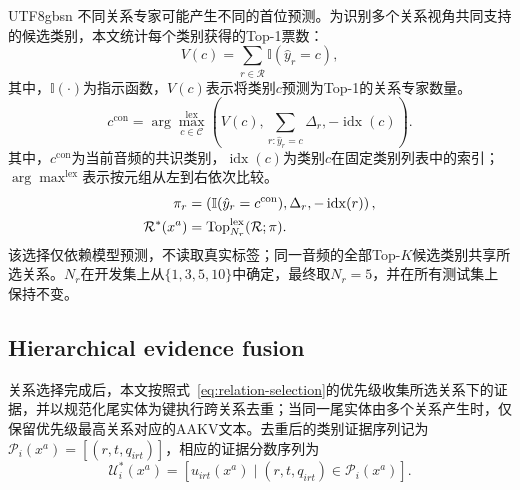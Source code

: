 \begin{CJK*}{UTF8}{gbsn}
不同关系专家可能产生不同的首位预测。为识别多个关系视角共同支持的候选类别，本文统计每个类别获得的Top-1票数：
\begin{equation}
V(c)=\sum_{r\in\mathcal R}\mathbb I(\hat y_r=c),
\label{eq:voting}
\end{equation}
其中，$\mathbb I(\cdot)$为指示函数，$V(c)$表示将类别$c$预测为Top-1的关系专家数量。
\begin{equation}
c^{\mathrm{con}}=\arg\max_{c\in\mathcal C}^{\mathrm{lex}}\left(V(c),\sum_{r:\hat y_r=c}\Delta_r,-\operatorname{idx}(c)\right).
\label{eq:consensus}
\end{equation}
其中，$c^{\mathrm{con}}$为当前音频的共识类别，$\operatorname{idx}(c)$为类别$c$在固定类别列表中的索引；$\arg\max^{\mathrm{lex}}$表示按元组从左到右依次比较。
\begin{equation}
\begin{aligned}
\pi_r&=\left(\mathbb I(\hat y_r=c^{\mathrm{con}}),\Delta_r,-\operatorname{idx}(r)\right),\\
\mathcal R^*(x^a)&=\operatorname{Top}_{N_r}^{\mathrm{lex}}(\mathcal R;\pi).
\end{aligned}
\label{eq:relation-selection}
\end{equation}
该选择仅依赖模型预测，不读取真实标签；同一音频的全部Top-$K$候选类别共享所选关系。$N_r$在开发集上从$\{1,3,5,10\}$中确定，最终取$N_r=5$，并在所有测试集上保持不变。

\subsection{Hierarchical evidence fusion}\label{sec:fusion-method}

关系选择完成后，本文按照式~\eqref{eq:relation-selection}的优先级收集所选关系下的证据，并以规范化尾实体为键执行跨关系去重；当同一尾实体由多个关系产生时，仅保留优先级最高关系对应的AAKV文本。去重后的类别证据序列记为$\mathcal P_i(x^a)=[(r,t,q_{irt})]$，相应的证据分数序列为
\begin{equation}
\mathcal U_i^*(x^a)=\left[u_{irt}(x^a)\mid(r,t,q_{irt})\in\mathcal P_i(x^a)\right].
\label{eq:selected-evidence}
\end{equation}


\end{CJK*}
